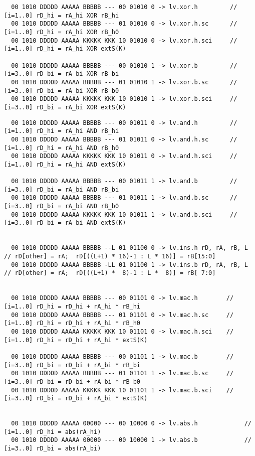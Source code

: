\begin{landscape}
\begin{verbatim}
  00 1010 DDDDD AAAAA BBBBB --- 00 01010 0 -> lv.xor.h         // [i=1..0] rD_hi = rA_hi XOR rB_hi
  00 1010 DDDDD AAAAA BBBBB --- 01 01010 0 -> lv.xor.h.sc      // [i=1..0] rD_hi = rA_hi XOR rB_h0
  00 1010 DDDDD AAAAA KKKKK KKK 10 01010 0 -> lv.xor.h.sci     // [i=1..0] rD_hi = rA_hi XOR extS(K)

  00 1010 DDDDD AAAAA BBBBB --- 00 01010 1 -> lv.xor.b         // [i=3..0] rD_bi = rA_bi XOR rB_bi
  00 1010 DDDDD AAAAA BBBBB --- 01 01010 1 -> lv.xor.b.sc      // [i=3..0] rD_bi = rA_bi XOR rB_b0
  00 1010 DDDDD AAAAA KKKKK KKK 10 01010 1 -> lv.xor.b.sci     // [i=3..0] rD_bi = rA_bi XOR extS(K)
\end{verbatim}

\clearpage
\begin{verbatim}
  00 1010 DDDDD AAAAA BBBBB --- 00 01011 0 -> lv.and.h         // [i=1..0] rD_hi = rA_hi AND rB_hi
  00 1010 DDDDD AAAAA BBBBB --- 01 01011 0 -> lv.and.h.sc      // [i=1..0] rD_hi = rA_hi AND rB_h0
  00 1010 DDDDD AAAAA KKKKK KKK 10 01011 0 -> lv.and.h.sci     // [i=1..0] rD_hi = rA_hi AND extS(K)

  00 1010 DDDDD AAAAA BBBBB --- 00 01011 1 -> lv.and.b         // [i=3..0] rD_bi = rA_bi AND rB_bi
  00 1010 DDDDD AAAAA BBBBB --- 01 01011 1 -> lv.and.b.sc      // [i=3..0] rD_bi = rA_bi AND rB_b0
  00 1010 DDDDD AAAAA KKKKK KKK 10 01011 1 -> lv.and.b.sci     // [i=3..0] rD_bi = rA_bi AND extS(K)


  00 1010 DDDDD AAAAA BBBBB --L 01 01100 0 -> lv.ins.h rD, rA, rB, L   // rD[other] = rA;  rD[((L+1) * 16)-1 : L * 16)] = rB[15:0]
  00 1010 DDDDD AAAAA BBBBB -LL 01 01100 1 -> lv.ins.b rD, rA, rB, L   // rD[other] = rA;  rD[((L+1) *  8)-1 : L *  8)] = rB[ 7:0]


  00 1010 DDDDD AAAAA BBBBB --- 00 01101 0 -> lv.mac.h        // [i=1..0] rD_hi = rD_hi + rA_hi * rB_hi
  00 1010 DDDDD AAAAA BBBBB --- 01 01101 0 -> lv.mac.h.sc     // [i=1..0] rD_hi = rD_hi + rA_hi * rB_h0
  00 1010 DDDDD AAAAA KKKKK KKK 10 01101 0 -> lv.mac.h.sci    // [i=1..0] rD_hi = rD_hi + rA_hi * extS(K)

  00 1010 DDDDD AAAAA BBBBB --- 00 01101 1 -> lv.mac.b        // [i=3..0] rD_bi = rD_bi + rA_bi * rB_bi
  00 1010 DDDDD AAAAA BBBBB --- 01 01101 1 -> lv.mac.b.sc     // [i=3..0] rD_bi = rD_bi + rA_bi * rB_b0
  00 1010 DDDDD AAAAA KKKKK KKK 10 01101 1 -> lv.mac.b.sci    // [i=3..0] rD_bi = rD_bi + rA_bi * extS(K)


  00 1010 DDDDD AAAAA 00000 --- 00 10000 0 -> lv.abs.h             // [i=1..0] rD_hi = abs(rA_hi)
  00 1010 DDDDD AAAAA 00000 --- 00 10000 1 -> lv.abs.b             // [i=3..0] rD_bi = abs(rA_bi)



\end{verbatim}
\end{landscape}
